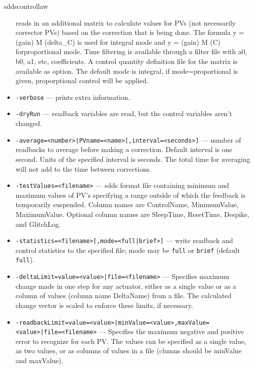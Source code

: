 \begin{sddsprog}{sddscontrollaw}
\begin{itemize}
                reads in an additional matrix to calculate values for PVs
               (not necessarily corrector PVs) based
               on the correction that is being done. The formula
               y = (gain) M (delta\_C) is used for integral mode and
               y = (gain) M (C) forproportional mode. Time filtering
               is available through a filter file with
               a0, b0, a1, etc, coefficients.
               A control quantity definition file for the matrix
               is available as option. The default mode is integral, if
               mode=proportional is given, proporptional control will be applied.
  \item {\tt -verbose} --- prints extra information.
  \item {\tt -dryRun} --- readback variables are read, but the control variables
               aren't changed.
  \item {\tt -average=<number>|PVname=<name>[,interval=<seconds>]} ---  number of readbacks to average before making a correction.
               Default interval is one second. Units of the specified
               interval is seconds. The total time for averaging will
               not add to the time between corrections.
  \item {\tt -testValues=<filename>} --- sdds format file containing minimum and maximum values
               of PV's specifying a range outside of which the feedback
               is temporarily suspended. Column names are ControlName,
               MinimumValue, MaximumValue. Optional column names are
               SleepTime, ResetTime, Despike, and GlitchLog.
  \item {\tt -statistics=<filename>[,mode=<full|brief>]} --- write readback and control statistics to the specified file; mode may be \verb|full| or \verb|brief| (default \verb|full|).
  \item {\tt -deltaLimit=value=<value>|file=<filename>} --- Specifies maximum change made in one step for any actuator,
               either as a single value or as a column of values (column name
               DeltaName) from a file. The calculated change vector is scaled
               to enforce these limits, if necessary.
  \item {\tt -readbackLimit=value=<value>|minValue=<value>,maxValue=<value>|file=<filename>} --- Specifies the maximum negative and positive error to
               recognize for each PV. The values can be specified
               as a single value, as two values, or as columns of
               values in a file (clumns should be minValue and maxValue).

\end{itemize}
\end{sddsprog}
